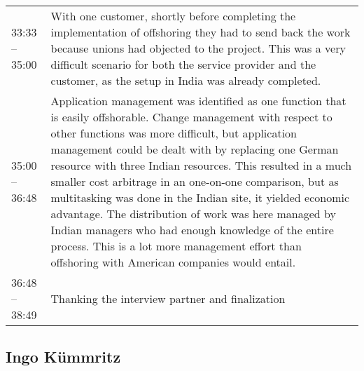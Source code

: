 \begin{appendix}
\begin{longtable}{l p{12.5cm}}
	33:33 -- 35:00& With one customer, shortly before completing the implementation of offshoring they had to send back the work because unions had objected to the project. This was a very difficult scenario for both the service provider and the customer, as the setup in India was already completed.\\
	35:00 -- 36:48&Application management was identified as one function that is easily offshorable. Change management with respect to other functions was more difficult, but application management could be dealt with by replacing one German resource with three Indian resources. This resulted in a much smaller cost arbitrage in an one-on-one comparison, but as multitasking was done in the Indian site, it yielded economic advantage. The distribution of work was here managed by Indian managers who had enough knowledge of the entire process. This is a lot more management effort than offshoring with American companies would entail.\\
	36:48 -- 38:49& Thanking the interview partner and finalization\\ 
\end{longtable}
\newpage
\tocless\subsection{Ingo Kümmritz}


\end{appendix}
